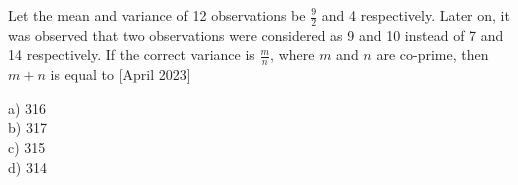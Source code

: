 \item Let the mean and variance of 12 observations be $\frac{9}{2}$ and 4 respectively. Later on, it was observed that two observations were considered as 9 and 10 instead of 7 and 14 respectively. If the correct variance is $\frac{m}{n}$, where $m$ and $n$ are co-prime, then $m+n$ is equal to \hfill{[April 2023]}
\begin{multicols}{4}
    a) 316\\
    b) 317\\
    c) 315\\
    d) 314
\end{multicols}

